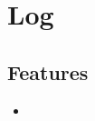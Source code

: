 \section{Log}
\label{module:Log}
\AvailableInJavaAndCsharp{\TODO}
\subsection{Features}
\begin{itemize}
	\item \TODO
\end{itemize}